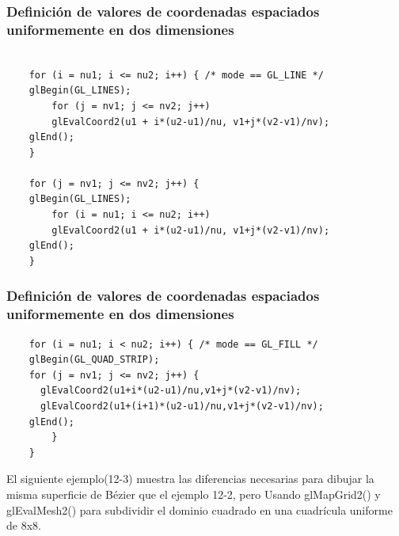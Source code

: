\documentclass[10.5pt]{beamer}
\begin{document}
\begin{frame}[fragile]
    \frametitle{Definición de valores de coordenadas espaciados uniformemente en dos dimensiones}

\begin{alertblock}{}
    \small
    \begin{verbatim}

    for (i = nu1; i <= nu2; i++) { /* mode == GL_LINE */
    glBegin(GL_LINES);
        for (j = nv1; j <= nv2; j++)
        glEvalCoord2(u1 + i*(u2-u1)/nu, v1+j*(v2-v1)/nv);
    glEnd();
    }

    for (j = nv1; j <= nv2; j++) {
    glBegin(GL_LINES);
        for (i = nu1; i <= nu2; i++)
        glEvalCoord2(u1 + i*(u2-u1)/nu, v1+j*(v2-v1)/nv);
    glEnd();
    }
    \end{verbatim}
\end{alertblock}
\end{frame}


\begin{frame}[fragile]
    \frametitle{Definición de valores de coordenadas espaciados uniformemente en dos dimensiones}

\begin{alertblock}{}
    \small
    \begin{verbatim}
    for (i = nu1; i < nu2; i++) { /* mode == GL_FILL */
    glBegin(GL_QUAD_STRIP);
    for (j = nv1; j <= nv2; j++) {
      glEvalCoord2(u1+i*(u2-u1)/nu,v1+j*(v2-v1)/nv);
      glEvalCoord2(u1+(i+1)*(u2-u1)/nu,v1+j*(v2-v1)/nv);
    glEnd();
        }
    }
\end{verbatim}
\end{alertblock}

El siguiente ejemplo(12-3) muestra las diferencias necesarias para dibujar la misma superficie de Bézier que el ejemplo 12-2, pero
Usando glMapGrid2() y glEvalMesh2() para subdividir el dominio cuadrado en una cuadrícula uniforme de 8x8.

\end{frame}
\end{document}
